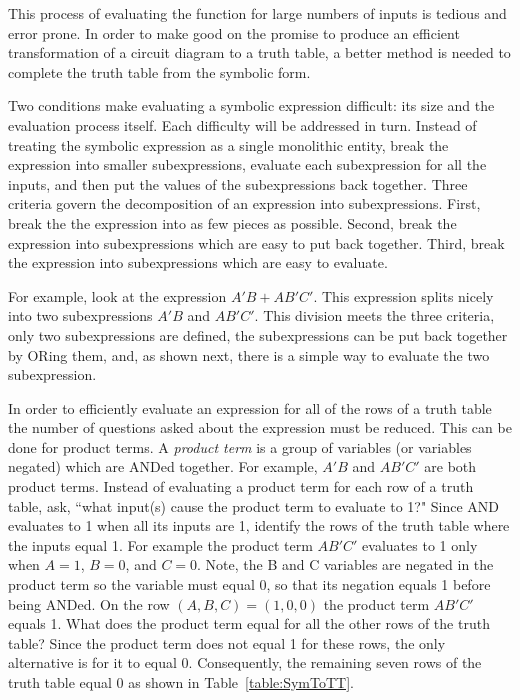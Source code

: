 This process of evaluating the function for large numbers of inputs is
tedious and error prone.  In order to make good on the
promise to produce an efficient transformation of a circuit diagram
to a truth table, a better method is needed to complete the truth table
from the symbolic form.

Two conditions make evaluating a symbolic expression
difficult: its size and the evaluation process itself.  Each difficulty
will be addressed in turn.  Instead of treating the symbolic expression
as a single monolithic entity, break the expression into smaller
subexpressions, evaluate each subexpression for all the inputs, and
then put the values of the subexpressions back together.  Three criteria govern
the decomposition of an expression into subexpressions. First, break the
the expression into as few pieces as possible.  Second, break the expression
into subexpressions which are easy to put back together.  Third, break the
expression into subexpressions which are easy to evaluate.

For example, look at the expression $A'B + AB'C'$.  This expression splits nicely
into two subexpressions $A'B$ and  $AB'C'$.  This division meets the three
criteria, only two subexpressions are defined, the subexpressions can be put
back together by ORing them, and, as shown next, there is a simple
way to evaluate the two subexpression.

In order to efficiently evaluate an expression for all of the rows of a
truth table the number of questions asked about the expression must
be reduced.  This can be done for product terms.
A \textit{product term}  is a group of variables
(or variables negated) which are ANDed together.   For example, $A'B$ and
$AB'C'$ are both product terms.  Instead of evaluating a product term for each
row of a truth table, ask, ``what input(s) cause the product term to
evaluate to 1?"  Since AND evaluates to 1 when all its inputs are 1,
identify the rows of the truth table where the inputs equal 1.
For example the product term $AB'C'$ evaluates to 1 only when $A=1$, $B=0$, and
$C=0$.  Note, the B and C variables are negated in the product term so the
variable must equal 0, so that its negation equals 1 before being ANDed.
On the row $(A,B,C) = (1,0,0)$ the product term $AB'C'$ equals 1.  What
does the product term equal for all the other rows of the truth table?
Since the product term does not equal 1 for these rows, the only alternative
is for it to equal 0.  Consequently, the remaining seven rows of the truth
table equal 0 as shown in Table~\ref{table:SymToTT}.

